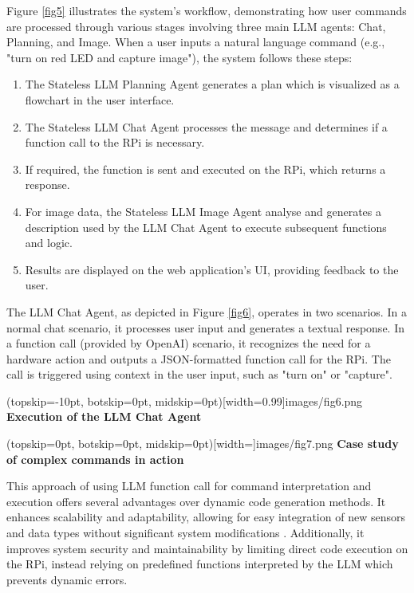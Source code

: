 \documentclass{ieeeaccess}
\begin{document}
Figure \ref{fig5} illustrates the system's workflow, demonstrating how user commands are processed through various stages involving three main LLM agents: Chat, Planning, and Image. When a user inputs a natural language command (e.g., "turn on red LED and capture image"), the system follows these steps:

\begin{enumerate}
    \item The Stateless LLM Planning Agent generates a plan which is visualized as a flowchart in the user interface.
    \item The Stateless LLM Chat Agent processes the message and determines if a function call to the RPi is necessary.
    \item If required, the function is sent and executed on the RPi, which returns a response.
    \item For image data, the Stateless LLM Image Agent analyse and generates a description used by the LLM Chat Agent to execute subsequent functions and logic.
    \item Results are displayed on the web application's UI, providing feedback to the user.
\end{enumerate}

The LLM Chat Agent, as depicted in Figure \ref{fig6}, operates in two scenarios. In a normal chat scenario, it processes user input and generates a textual response. In a function call (provided by OpenAI) scenario, it recognizes the need for a hardware action and outputs a JSON-formatted function call for the RPi. The call is triggered using context in the user input, such as "turn on" or "capture".

\Figure[h!](topskip=-10pt, botskip=0pt,
midskip=0pt)[width=0.99\columnwidth]{{images/fig6.png}}
{ \textbf{Execution of the LLM Chat Agent}\label{fig6}}

\Figure[t!](topskip=0pt, botskip=0pt,
midskip=0pt)[width=\textwidth]{{images/fig7.png}}
{ \textbf{Case study of complex commands in action}\label{fig7}}

This approach of using LLM function call for command interpretation and execution offers several advantages over dynamic code generation methods. It enhances scalability and adaptability, allowing for easy integration of new sensors and data types without significant system modifications \cite{yang2023autogptonlinedecisionmaking}. Additionally, it improves system security and maintainability by limiting direct code execution on the RPi, instead relying on predefined functions interpreted by the LLM which prevents dynamic errors.
\end{document}
